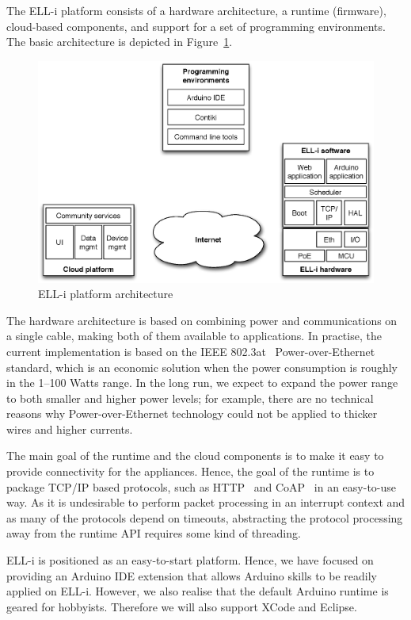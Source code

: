 \documentclass{siamltex}
\begin{document}
The ELL-i platform consists of a hardware architecture, a runtime
(firmware), cloud-based components, and support for a set of
programming environments.  The basic architecture is depicted in
Figure~\ref{fig:arch}.

\begin{figure}
\centering
\includegraphics[scale=.55]{figures/arch.eps}
\caption{ELL-i platform architecture}
\label{fig:arch}
\end{figure}

The hardware architecture is based on combining power and
communications on a single cable, making both of them available to
applications.  In practise, the current implementation is based on the
IEEE 802.3at~\cite{802.3at} Power-over-Ethernet standard, which is an economic
solution when the power consumption is roughly in the 1--100 Watts
range. In the long run, we expect to expand the power range to both
smaller and higher power levels; for example, there are no technical
reasons why Power-over-Ethernet technology could not be applied to thicker wires
and higher currents.

The main goal of the runtime and the cloud components is to make it easy
to provide connectivity for the appliances.  Hence, the goal of the
runtime is to package TCP/IP based protocols, such as HTTP~\cite{fielding1999hypertext}
and CoAP~\cite{shelby2013constrained} in an easy-to-use way.  As it is undesirable to
perform packet processing in an interrupt context and as many of the
protocols depend on timeouts, abstracting the protocol processing away
from the runtime API requires some kind of threading.

ELL-i is positioned as an easy-to-start platform.
Hence, we have focused on providing an Arduino IDE
extension that allows Arduino skills to be readily applied on ELL-i.
However, we also realise that the default Arduino runtime is geared
for hobbyists.  Therefore we will also support XCode and Eclipse.
\end{document}
